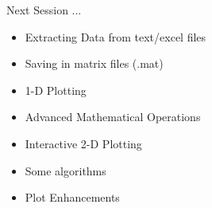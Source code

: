 \documentclass[10pt]{beamer}
\begin{document}
\begin{frame}{Next Session ...}
	\begin{itemize}
		\item Extracting Data from text/excel files
		\item Saving in matrix files (.mat)
		\item 1-D Plotting
		\item Advanced Mathematical Operations
		\item Interactive 2-D Plotting
		\item Some algorithms
		\item Plot Enhancements
	\end{itemize}

\end{frame}
\end{document}
